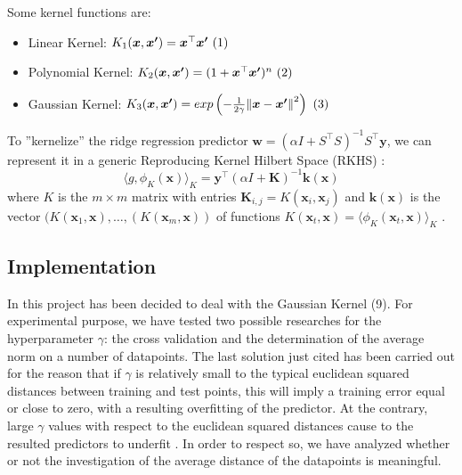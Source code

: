 \documentclass{article}
\begin{document}
Some kernel functions are:
\begin{itemize}
	\item Linear Kernel: $K_1(\boldsymbol{x},\boldsymbol{x^\prime}) = \boldsymbol{x}^\top\boldsymbol{x^\prime}\hfill
	      \stepcounter{equation}\ (\theequation)$
	\item Polynomial Kernel: $K_2(\boldsymbol{x},\boldsymbol{x^\prime}) = (1 + \boldsymbol{x}^\top\boldsymbol{x^\prime})^n\hfill \stepcounter{equation}\ (\theequation)$
	\item Gaussian Kernel: 
	      $K_3(\boldsymbol{x},\boldsymbol{x^\prime}) = exp \left(-\frac{1}{2\gamma}\norm{\boldsymbol{x}-\boldsymbol{x^\prime}}^2 \right)\hfill
	      \stepcounter{equation}\ (\theequation)$
\end{itemize}
To ''kernelize'' the ridge regression predictor $\boldsymbol{w} = (\alpha I + S^\top S)^{-1}S^\top \boldsymbol{y}$, we can represent it in a generic Reproducing Kernel Hilbert Space (RKHS) \cite{rhks}: 
\begin{equation}
	\label{KRR}\langle{g,\phi_K(\boldsymbol{x})}\rangle_K = \boldsymbol{y^\top}(\alpha I + \boldsymbol{K})^{-1} \boldsymbol{k}(\boldsymbol{x})
\end{equation} 
where $K$ is the $m \times m$ matrix with entries $\boldsymbol{K}_{i,j} = K(\boldsymbol{x}_i,\boldsymbol{x}_j)$ and $\boldsymbol{k}(\boldsymbol{x})$ is the vector $(K(\boldsymbol{x}_1, \boldsymbol{x}), \dots, (K(\boldsymbol{x}_m, \boldsymbol{x}))$ of functions $K(\boldsymbol{x}_t, \boldsymbol{x}) = \langle{\phi_K(\boldsymbol{x}_t, \boldsymbol{x})}\rangle_K$ 
\cite{profk}.

\subsection{Implementation}
\label{kernelimpl}
In this project has been decided to deal with the Gaussian Kernel (9).
For experimental purpose, we have tested two possible researches for the hyperparameter $\gamma$: the cross validation and the determination of the average norm on a number of datapoints. The last solution just cited has been carried out for the reason that if $\gamma$ is relatively small to the typical euclidean squared distances between training and test points, this will imply a training error equal or close to zero, with a resulting overfitting of the predictor. At the contrary, large $\gamma$ values with respect to the euclidean squared distances cause to the resulted predictors to underfit \cite{profk}. In order to respect so, we have analyzed whether or not the investigation of the average distance of the datapoints is meaningful.\newline
\end{document}
